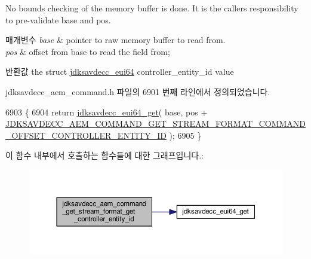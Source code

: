 No bounds checking of the memory buffer is done. It is the caller\textquotesingle{}s responsibility to pre-\/validate base and pos.


\begin{DoxyParams}{매개변수}
{\em base} & pointer to raw memory buffer to read from. \\
\hline
{\em pos} & offset from base to read the field from; \\
\hline
\end{DoxyParams}
\begin{DoxyReturn}{반환값}
the struct \hyperlink{structjdksavdecc__eui64}{jdksavdecc\+\_\+eui64} controller\+\_\+entity\+\_\+id value 
\end{DoxyReturn}


jdksavdecc\+\_\+aem\+\_\+command.\+h 파일의 6901 번째 라인에서 정의되었습니다.


\begin{DoxyCode}
6903 \{
6904     \textcolor{keywordflow}{return} \hyperlink{group__eui64_ga2652311a25a6b91cddbed75c108c7031}{jdksavdecc\_eui64\_get}( base, pos + 
      \hyperlink{group__command__get__stream__format_ga77c33685cfa72128b2a2fef4a9c9fbe8}{JDKSAVDECC\_AEM\_COMMAND\_GET\_STREAM\_FORMAT\_COMMAND\_OFFSET\_CONTROLLER\_ENTITY\_ID}
       );
6905 \}
\end{DoxyCode}


이 함수 내부에서 호출하는 함수들에 대한 그래프입니다.\+:
\nopagebreak
\begin{figure}[H]
\begin{center}
\leavevmode
\includegraphics[width=350pt]{group__command__get__stream__format_ga781a01e53a70dbe68e7cedaf38a0ce2a_cgraph}
\end{center}
\end{figure}


